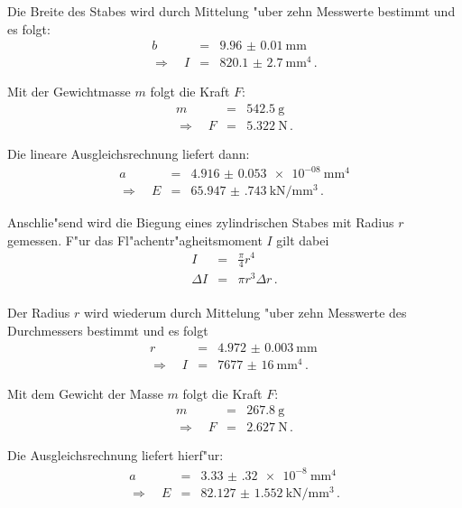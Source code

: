 		Die Breite des Stabes wird durch Mittelung "uber zehn Messwerte bestimmt und es folgt:
		\begin{eqnarray*}
			b & = & \SI{9.96(1)}{\milli \meter} \, \\
			\Rightarrow \quad I & = & \SI{820.1(27)}{\milli \meter \tothe{4}} \,. 
		\end{eqnarray*}

		Mit der Gewichtmasse $m$ folgt die Kraft $F$:
		\begin{eqnarray*}
			m & = & \SI{542.5}{\gram} \, \\
			\Rightarrow \quad F & = & \SI{5.322}{\newton} \,.
		\end{eqnarray*}

		Die lineare Ausgleichsrechnung liefert dann:
		\begin{eqnarray*}
			a & = & \SI{4.916(53)e-08}{\milli \meter \tothe{4}} \\
			\Rightarrow \quad E & = & \SI{65.947(743)}{\kilo \newton \per \milli \meter \cubed} \,.
		\end{eqnarray*}

		Anschlie"send wird die Biegung eines zylindrischen Stabes mit Radius $r$ gemessen.
		F"ur das Fl"achentr"agheitsmoment $I$ gilt dabei
		\begin{eqnarray*}
			I & = & \frac{\pi}{4}r^4 \,\\
			\Delta I & = & \pi r^3 \Delta r \,. \\
		\end{eqnarray*}

		Der Radius $r$ wird wiederum durch Mittelung "uber zehn Messwerte des Durchmessers bestimmt und es folgt
		\begin{eqnarray*}
			r & = & \SI{4.972(3)}{\milli \meter} \, \\
			\Rightarrow \quad I & = & \SI{7677(16)}{\milli \meter \tothe{4}} \,. 
		\end{eqnarray*}

		Mit dem Gewicht der Masse $m$ folgt die Kraft $F$:
		\begin{eqnarray*}
			m & = & \SI{267.8}{\gram} \, \\
			\Rightarrow \quad F & = & \SI{2.627}{\newton} \,.
		\end{eqnarray*}

		Die Ausgleichsrechnung liefert hierf"ur:
		\begin{eqnarray*}
			a & = & \SI{3.33(32)e-8}{\milli \meter \tothe{4}} \\
			\Rightarrow \quad E & = & \SI{82.127(1552)}{\kilo \newton \per \milli \meter \cubed} \,.
		\end{eqnarray*}

